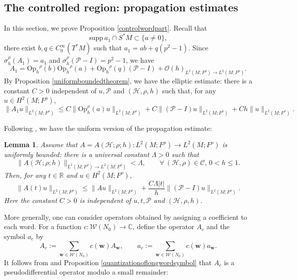 \documentclass[11pt,oneside,reqno]{amsart}
\newcommand\Oph{\ensuremath{\mathrm{Op}_h}}
\newtheorem{lemma}[theorem]{Lemma}
\theoremstyle{definition}
\numberwithin{equation}{section}
\theoremstyle{plain}
\begin{document}
\subsection{The controlled region: propagation estimates}
In this section, we prove Proposition \ref{controlwordpart}. Recall that 
\begin{equation*}
    \mathrm{supp}\,a_1\cap S^*M \subset \{a\not=0\},
\end{equation*}
there exist $b,q\in C_{0}^{\infty}(T^*M)$ such that $a_1=ab+q(p^2-1)$. Since $\sigma_{h}^{\rho}(A_1)=a_1$ and $\sigma_{h}^{\rho}(\mathcal{P} -I)=p^2-1$, we have
\begin{equation*}
    A_{1}=\Oph^{\rho}(b)\Oph^{\rho}(a)+\Oph^{\rho}(q)(\mathcal{P} -I)+\mathcal{O}(h)_{L^2(M;F^\rho) \rightarrow L^2(M;F^\rho)}.
\end{equation*}
By Proposition \ref{uniformboundedtheorem}, we have the elliptic estimate: there is a constant $C>0$ independent of $u,\mathcal{P}$ and $(\mathcal{H},\rho,h)$ such that, for any $u\in H^2(M;F^{\rho})$,
\begin{equation}\label{ellipticestimate}
 \|A_1 u \|_{L^2(M;F^\rho)} \leq C \|\mathrm{Op}_h^{\rho}(a) u \|_{L^2(M;F^\rho)} + C \| (\mathcal{P} -I ) u \|_{L^2(M;F^\rho)}+C h\|u\|_{L^2(M;F^\rho)}. 
\end{equation}

Following \cite[Lemma 4.2]{dyatlov2018semiclassical}, we have the uniform version of the propagation estimate:

\begin{lemma}
    Assume that $A=A(\mathcal{H};\rho;h): L^2(M;F^{\rho}) \rightarrow L^2(M;F^{\rho})$ is uniformly bounded: there is a universal constant $\Lambda>0$ such that
    \begin{equation*}
        \|A(\mathcal{H};\rho;h)\|_{L^2(M;F^\rho) \rightarrow L^2(M;F^\rho)} < \Lambda, \qquad \forall \ (\mathcal{H},\rho)\in\mathcal{C},\,0<h\leq 1.
    \end{equation*}
Then, for any $t \in \mathbb{R}$ and $u \in H^2(M;F^{\rho})$,
\begin{equation}\label{propagationestimate}
\|A(t) u\|_{L^2(M;F^\rho)} \leq\|A u\|_{L^2(M;F^\rho)}+\frac{C\Lambda|t|}{h}\|(\mathcal{P}-I) u\|_{L^2(M;F^\rho)}.
\end{equation}
Here the constant $C>0$ is independent of $u,t,\mathcal{P}$ and $(\mathcal{H},\rho,h)$.
\end{lemma}


More generally, one can consider operators obtained by assigning a coefficient to each word. For a function $c: \mathcal{W}(N_0) \rightarrow \mathbb{C}$, define the operator $A_c$ and the symbol $a_c$ by
\begin{equation*}
    A_c:=\sum_{\mathbf{w} \in \mathcal{W}(N_0)} c(\mathbf{w}) A_{\mathbf{w}}, \qquad a_c:=\sum_{\mathbf{w} \in \mathcal{W}(N_0)} c(\mathbf{w}) a_{\mathbf{w}} .
\end{equation*}
It follows from \cite[Lemma 4.4]{dyatlov2018semiclassical} and Proposition \ref{quantizationoflongwordsymbol} that $A_c$ is a pseudodifferential operator modulo a small remainder:
\end{document}
